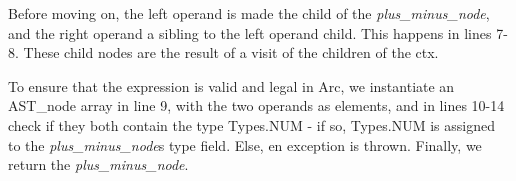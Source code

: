 Before moving on, the left operand is made the child of the \textit{plus\_minus\_node}, and the right operand a sibling to the left operand child. This happens in lines 7-8. These child nodes are the result of a visit of the children of the ctx.

To ensure that the expression is valid and legal in Arc, we instantiate an AST\_node array in line 9, with the two operands as elements, and in lines 10-14 check if they both contain the type Types.NUM - if so, Types.NUM is assigned to the \textit{plus\_minus\_node}s type field. Else, en exception is thrown. Finally, we return the \textit{plus\_minus\_node}.